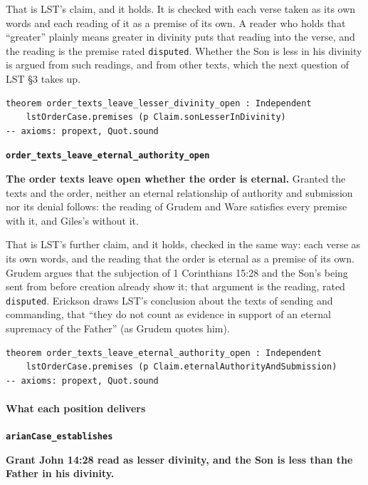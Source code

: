 \documentclass[11pt,paper=\testimonypaper,DIV=13,parskip=false]{scrartcl}
\begin{document}
That is LST’s claim, and it holds. It is checked with each verse taken as its own words and each reading of it as a premise of its own. A reader who holds that “greater” plainly means greater in divinity puts that reading into the verse, and the reading is the premise rated \texttt{disputed}. Whether the Son is less in his divinity is argued from such readings, and from other texts, which the next question of LST §3 takes up.

{\small\begin{verbatim}
theorem order_texts_leave_lesser_divinity_open : Independent
    lstOrderCase.premises (p Claim.sonLesserInDivinity)
-- axioms: propext, Quot.sound
\end{verbatim}}
\par\medskip\noindent\textbf{\texttt{order\_\allowbreak{}texts\_\allowbreak{}leave\_\allowbreak{}eternal\_\allowbreak{}authority\_\allowbreak{}open}}\par\nobreak\noindent
\textbf{The order texts leave open whether the order is eternal.} Granted the texts and the order, neither an eternal relationship of authority and submission nor its denial follows: the reading of Grudem and Ware satisfies every premise with it, and Giles’s without it.

That is LST’s further claim, and it holds, checked in the same way: each verse as its own words, and the reading that the order is eternal as a premise of its own. Grudem argues that the subjection of 1 Corinthians 15:28 and the Son’s being sent from before creation already show it; that argument is the reading, rated \texttt{disputed}. Erickson draws LST’s conclusion about the texts of sending and commanding, that “they do not count as evidence in support of an eternal supremacy of the Father” (as Grudem quotes him).

{\small\begin{verbatim}
theorem order_texts_leave_eternal_authority_open : Independent
    lstOrderCase.premises (p Claim.eternalAuthorityAndSubmission)
-- axioms: propext, Quot.sound
\end{verbatim}}
\paragraph*{What each position delivers}
\leavevmode\par\nobreak
\par\medskip\noindent\textbf{\texttt{arian\allowbreak{}Case\_\allowbreak{}establishes}}\par\nobreak\noindent
\textbf{Grant John 14:28 read as lesser divinity, and the Son is less than the Father in his divinity.}
\end{document}
